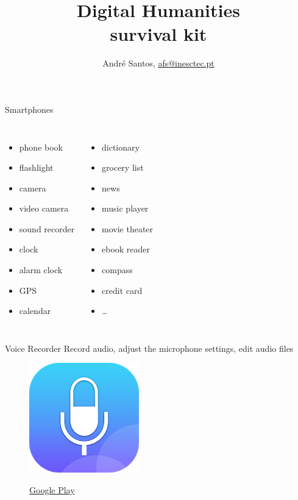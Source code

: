 \documentclass[serif,14pt,color=usenames,dvipsnames]{beamer}
\title{{\Large Digital Humanities}\\survival kit}
\author{André Santos, \href{mailto:afs@inesctec.pt}{afs@inesctec.pt}}
\begin{document}
\begin{frame}
\maketitle
\end{frame}






\begin{frame}{Smartphones}
  \begin{columns}
    \begin{itemize}
      \item phone book
      \item flashlight
      \item camera
      \item video camera
      \item sound recorder
      \item clock
      \item alarm clock
      \item GPS
      \item calendar
    \end{itemize}
    \begin{itemize}
      \item dictionary
      \item grocery list
      \item news
      \item music player
      \item movie theater
      \item ebook reader
      \item compass
      \item credit card
      \item \dots
    \end{itemize}
  \end{columns}
\end{frame}

\begin{frame}{Voice Recorder}
 Record audio, adjust the microphone settings, edit audio files

  \begin{figure}
    \centering
    \includegraphics[width=0.25\linewidth]{imgs/vr}

    \href{https://play.google.com/store/apps/details?id=vr.audio.voicerecorderpro}{Google
Play }
  \end{figure}

\end{frame}
\end{document}

